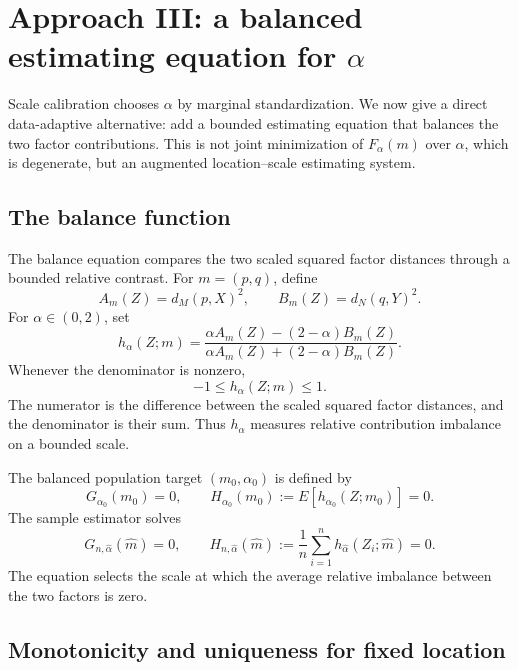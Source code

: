 \documentclass[11pt]{article}
\newcommand{\1}{\mathbf{1}}
\begin{document}
\section{Approach III: a balanced estimating equation for $\alpha$}\label{sec:balanced}

Scale calibration chooses $\alpha$ by marginal standardization.  We now give a
direct data-adaptive alternative: add a bounded estimating equation that balances
the two factor contributions.  This is not joint minimization of
$F_\alpha(m)$ over $\alpha$, which is degenerate, but an augmented
location--scale estimating system.

\subsection{The balance function}

The balance equation compares the two scaled squared factor distances through a
bounded relative contrast.  For $m=(p,q)$, define
\[
 A_m(Z)=d_M(p,X)^2,
 \qquad
 B_m(Z)=d_N(q,Y)^2.
\]
For $\alpha\in(0,2)$, set
\begin{equation}\label{eq:h-alpha}
 h_\alpha(Z;m)
 =
 \frac{\alpha A_m(Z)-(2-\alpha)B_m(Z)}
 {\alpha A_m(Z)+(2-\alpha)B_m(Z)}.
\end{equation}
Whenever the denominator is nonzero,
\[
 -1\le h_\alpha(Z;m)\le1.
\]
The numerator is the difference between the scaled squared factor distances, and the denominator is their sum.  Thus $h_\alpha$ measures relative contribution imbalance on a bounded scale.

The balanced population target $(m_0,\alpha_0)$ is defined by
\begin{equation}\label{eq:balanced-pop-eq}
 G_{\alpha_0}(m_0)=0,
 \qquad
 H_{\alpha_0}(m_0):=E[h_{\alpha_0}(Z;m_0)]=0.
\end{equation}
The sample estimator solves
\begin{equation}\label{eq:balanced-sample-eq}
 G_{n,\widehat\alpha}(\widehat m)=0,
 \qquad
 H_{n,\widehat\alpha}(\widehat m):=\frac1n\sum_{i=1}^n h_{\widehat\alpha}(Z_i;\widehat m)=0.
\end{equation}
The equation selects the scale at which the average relative imbalance between
the two factors is zero.

\subsection{Monotonicity and uniqueness for fixed location}
\end{document}
